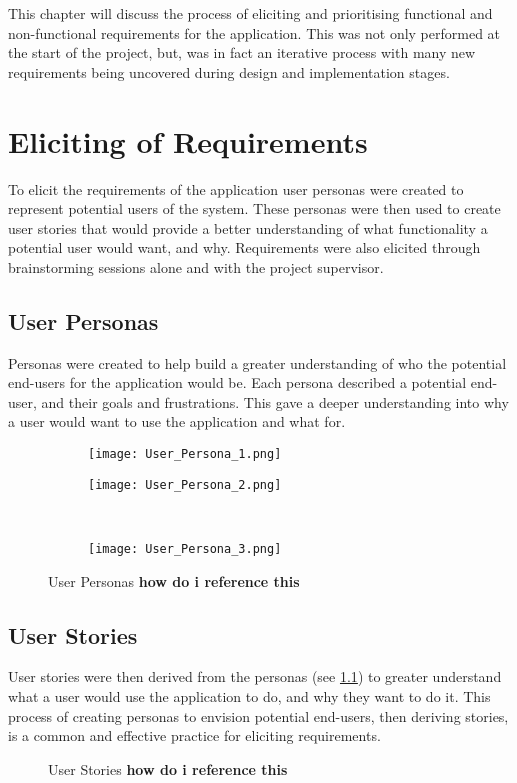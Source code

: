 This chapter will discuss the process of eliciting and prioritising functional and non-functional requirements for the application. This was not only performed at the start of the project, but, was in fact an iterative process with many new requirements being uncovered during design and implementation stages.
\section{Eliciting of Requirements}
To elicit the requirements of the application user personas were created to represent potential users of the system. These personas were then used to create user stories that would provide a better understanding of what functionality a potential user would want, and why. Requirements were also elicited through brainstorming sessions alone and with the project supervisor.
\subsection{User Personas} \label{personas}
Personas were created to help build a greater understanding of who the potential end-users for the application would be. Each persona described a potential end-user, and their goals and frustrations. This gave a deeper understanding into why a user would want to use the application and what for.
\begin{figure}[!htbp]
    \centering
    \begin{subfigure}[b]{0.45\textwidth}
        \texttt{[image: User\_Persona\_1.png]}
    \end{subfigure}
    \hspace{0.5em}
    \begin{subfigure}[b]{0.45\textwidth}
        \texttt{[image: User\_Persona\_2.png]}
    \end{subfigure}
    \\[0.5ex]
    \begin{subfigure}[b]{0.45\textwidth}
        \texttt{[image: User\_Persona\_3.png]}
    \end{subfigure}
    \caption{User Personas \textbf{how do i reference this}}
    \label{fig:personas}
\end{figure}
\FloatBarrier
\subsection{User Stories}
User stories were then derived from the personas (see \ref{personas}) to greater understand what a user would use the application to do, and why they want to do it. This process of creating personas to envision potential end-users, then deriving stories, is a common and effective practice for eliciting requirements. 
\begin{figure}[!htbp]
    \centering
    \begin{subfigure}[b]{0.90\textwidth}
    \end{subfigure}
    \caption{User Stories \textbf{how do i reference this}}
    \label{fig:stories}
\end{figure}
\FloatBarrier
